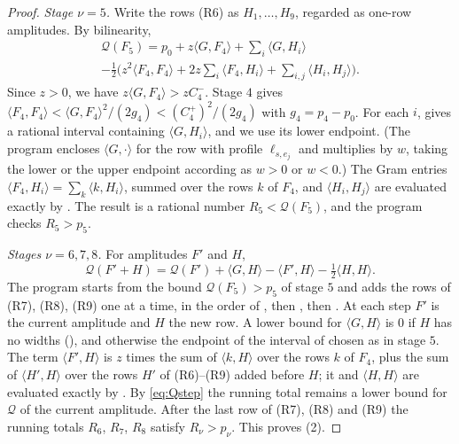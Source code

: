 \documentclass[11pt,colorlinks]{charlie}
\begin{document}
\begin{proof}
\emph{Stage $\nu=5$.} Write the rows (R6) as $H_1,\dots,H_9$, regarded as one-row amplitudes. By bilinearity,
\begin{multline*}
 \mathcal Q(F_5)=p_0+z\langle G,F_4\rangle+\sum_i\langle G,H_i\rangle\\
 -\frac12\Big(z^2\langle F_4,F_4\rangle+2z\sum_i\langle F_4,H_i\rangle+\sum_{i,j}\langle H_i,H_j\rangle\Big).
\end{multline*}
Since $z>0$, we have $z\langle G,F_4\rangle>zC_4^-$. Stage $4$ gives $\langle F_4,F_4\rangle<\langle G,F_4\rangle^2/(2g_4)<(C_4^+)^2/(2g_4)$ with $g_4=p_4-p_0$. For each $i$,  gives a rational interval containing $\langle G,H_i\rangle$, and we use its lower endpoint. (The program encloses $\langle G,\cdot\rangle$ for the row with profile $\ell_{s,e_j}$ and multiplies by $w$, taking the lower or the upper endpoint according as $w>0$ or $w<0$.) The Gram entries $\langle F_4,H_i\rangle=\sum_k\langle k,H_i\rangle$, summed over the rows $k$ of $F_4$, and $\langle H_i,H_j\rangle$ are evaluated exactly by . The result is a rational number $R_5<\mathcal Q(F_5)$, and the program checks $R_5>p_5$.

\emph{Stages $\nu=6,7,8$.} For amplitudes $F'$ and $H$,
\begin{equation}\label{eq:Qstep}
 \mathcal Q(F'+H)=\mathcal Q(F')+\langle G,H\rangle-\langle F',H\rangle-\tfrac12\langle H,H\rangle .
\end{equation}
The program starts from the bound $\mathcal Q(F_5)>p_5$ of stage $5$ and adds the rows of (R7), (R8), (R9) one at a time, in the order of , then , then . At each step $F'$ is the current amplitude and $H$ the new row. A lower bound for $\langle G,H\rangle$ is $0$ if $H$ has no widths (), and otherwise the endpoint of the interval of  chosen as in stage $5$. The term $\langle F',H\rangle$ is $z$ times the sum of $\langle k,H\rangle$ over the rows $k$ of $F_4$, plus the sum of $\langle H',H\rangle$ over the rows $H'$ of (R6)--(R9) added before $H$; it and $\langle H,H\rangle$ are evaluated exactly by . By \eqref{eq:Qstep} the running total remains a lower bound for $\mathcal Q$ of the current amplitude. After the last row of (R7), (R8) and (R9) the running totals $R_6$, $R_7$, $R_8$ satisfy $R_\nu>p_\nu$. This proves (2).
\end{proof}
\end{document}
